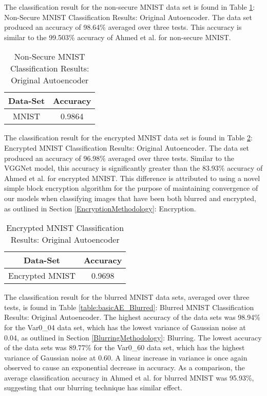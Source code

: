 \documentclass[12pt, titlepage]{article}
\begin{document}
The classification result for the non-secure MNIST data set is found in Table \ref{table:basicAE_MNIST}: Non-Secure MNIST Classification Results: Original Autoencoder. The data set produced an accuracy of 98.64\% averaged over three tests. This accuracy is similar to the 99.503\% accuracy of Ahmed et al. for non-secure MNIST.\\ 

\begin{table}[!h]
	\begin{center}
		\begin{tabular}{| c | c |}
			\hline
			\textbf{Data-Set} & \textbf{Accuracy}\\
			\hline
			MNIST & 0.9864\\
			\hline
		\end{tabular}
		\caption{Non-Secure MNIST Classification Results: Original Autoencoder}
		\label{table:basicAE_MNIST}
	\end{center}
\end{table}

\noindent The classification result for the encrypted MNIST data set is found in Table \ref{table:basicAE_Encryption}: Encrypted MNIST Classification Results: Original Autoencoder. The data set produced an accuracy of 96.98\% averaged over three tests. Similar to the VGGNet model, this accuracy is significantly greater than the 83.93\% accuracy of Ahmed et al. for encrypted MNIST. This difference is attributed to using a novel simple block encryption algorithm for the purpose of maintaining convergence of our models when classifying images that have been both blurred and encrypted, as outlined in Section \ref{EncryptionMethodology}: Encryption.\\

\begin{table}[!h]
	\begin{center}
		\begin{tabular}{| c | c |}
			\hline
			\textbf{Data-Set} & \textbf{Accuracy}\\
			\hline
			Encrypted MNIST & 0.9698\\
			\hline
		\end{tabular}
		\caption{Encrypted MNIST Classification Results: Original Autoencoder}
		\label{table:basicAE_Encryption}
	\end{center}
\end{table}

\noindent The classification result for the blurred MNIST data sets, averaged over three tests, is found in Table \ref{table:basicAE_Blurred}: Blurred MNIST Classification Results: Original Autoencoder. The highest accuracy of the data sets was 98.94\% for the Var0\_04 data set, which has the lowest variance of Gaussian noise at 0.04, as outlined in Section \ref{BlurringMethodology}: Blurring. The lowest accuracy of the data sets was 89.77\% for the Var0\_60 data set, which has the highest variance of Gaussian noise at 0.60. A linear increase in variance is once again observed to cause an exponential decrease in accuracy. As a comparison, the average classification accuracy in Ahmed et al. for blurred MNIST was 95.93\%, suggesting that our blurring technique has similar effect.
\end{document}
